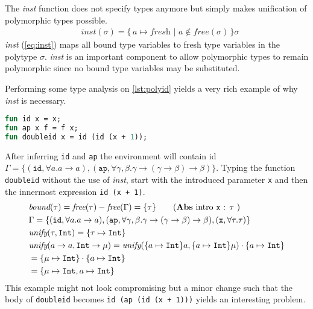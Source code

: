 \documentclass[11pt,oneside,a4paper]{report}
\begin{document}
The \textit{inst} function does not specify types anymore but simply makes unification of polymorphic types possible.
\begin{align}
    &\textit{inst}(\sigma) = \{ \, a \mapsto \textit{fresh} \,\,|\,\, a \notin \textit{free}(\sigma) \, \}\sigma
    \label{eq:inst}
\end{align}
\textit{inst} (\autoref{eq:inst}) maps all bound type variables to fresh type variables in the polytype $\sigma$.
\textit{inst} is an important component to allow polymorphic types to remain polymorphic since no bound type variables may be substituted.
\begin{exmp}
    Performing some type analysis on \autoref{lst:polyid} yields a very rich example of why \textit{inst} is necessary.
\begin{lstlisting}[language=ML,caption={Polymorphic id},label={lst:polyid},mathescape=true]
fun id x = x;
fun ap x f = f x;
fun doubleid x = id (id (x + 1));
\end{lstlisting}
    After inferring \texttt{id} and \texttt{ap} the environment will contain id $\Gamma = \{ (\texttt{id}, \forall a . a \rightarrow a), (\texttt{ap}, \forall \gamma,\beta . \gamma \rightarrow (\gamma \rightarrow \beta) \rightarrow \beta)\}$.
    Typing the function \texttt{doubleid} without the use of \textit{inst}, start with the introduced parameter \texttt{x} and then the innermost expression \texttt{id (x + 1)}. 
\begin{align}
    &\textit{bound}(\tau) = \textit{free}(\tau) - \textit{free}(\Gamma) = \{ \tau \} \tag{\textbf{Abs} intro \texttt{x} : $\tau$ }\\
    &\Gamma = \{ (\texttt{id}, \forall a . a \rightarrow a), (\texttt{ap}, \forall \gamma,\beta . \gamma \rightarrow (\gamma \rightarrow \beta) \rightarrow \beta), (\texttt{x}, \forall \tau . \tau) \}\\
    &\textit{unify}(\tau, \texttt{Int}) = \{ \tau \mapsto \texttt{Int} \}\\
    &\textit{unify}(a \rightarrow a, \texttt{Int} \rightarrow \mu) = \textit{unify}(\{ a \mapsto \texttt{Int} \}a, \{ a \mapsto \texttt{Int} \}\mu) \cdot \{ a \mapsto \texttt{Int} \}\\
    &= \{ \mu \mapsto \texttt{Int} \} \cdot \{ a \mapsto \texttt{Int} \} \tag*{}\\
    &= \{ \mu \mapsto \texttt{Int}, a \mapsto \texttt{Int} \} \tag*{}
    \label{eq:unifyres}
\end{align}
    This example might not look compromising but a minor change such that the body of \texttt{doubleid} becomes \texttt{id (ap (id (x + 1)))} yields an interesting problem.

\end{exmp}
\end{document}
